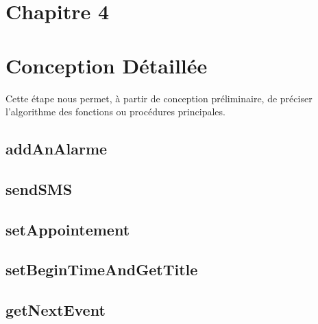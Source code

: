 \section*{Chapitre 4}
\section{Conception Détaillée}
\indent Cette étape nous permet, à partir de conception préliminaire, de préciser l'algorithme des fonctions ou procédures principales.

\subsection{addAnAlarme}
	

\subsection{sendSMS}
	

\subsection{setAppointement}
	
	\newpage

\subsection{setBeginTimeAndGetTitle}
	
	\newpage
\subsection{getNextEvent}
	